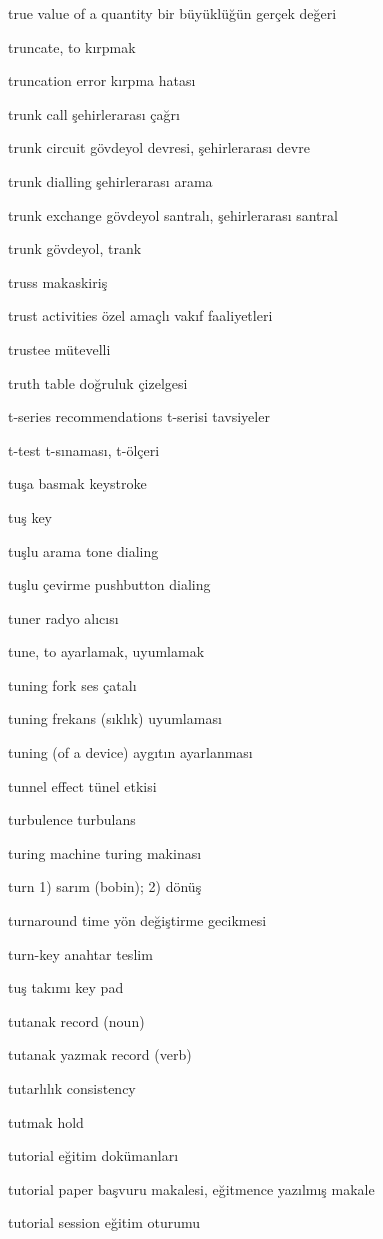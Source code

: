\documentclass[12pt,fleqn]{article}\usepackage{../../common}
\begin{document}
true value of a quantity bir büyüklüğün gerçek değeri

truncate, to kırpmak

truncation error kırpma hatası

trunk call şehirlerarası çağrı

trunk circuit gövdeyol devresi, şehirlerarası devre

trunk dialling şehirlerarası arama

trunk exchange gövdeyol santralı, şehirlerarası santral

trunk gövdeyol, trank

truss makaskiriş

trust activities özel amaçlı vakıf faaliyetleri

trustee mütevelli

truth table doğruluk çizelgesi

t-series recommendations t-serisi tavsiyeler

t-test t-sınaması, t-ölçeri

tuşa basmak keystroke

tuş key

tuşlu arama tone dialing

tuşlu çevirme pushbutton dialing

tuner radyo alıcısı

tune, to ayarlamak, uyumlamak

tuning fork ses çatalı

tuning frekans (sıklık) uyumlaması

tuning (of a device) aygıtın ayarlanması

tunnel effect tünel etkisi

turbulence turbulans

turing machine turing makinası

turn 1) sarım (bobin); 2) dönüş

turnaround time yön değiştirme gecikmesi

turn-key anahtar teslim

tuş takımı key pad

tutanak record (noun)

tutanak yazmak record (verb)

tutarlılık consistency

tutmak hold

tutorial eğitim dokümanları

tutorial paper başvuru makalesi, eğitmence yazılmış makale

tutorial session eğitim oturumu
\end{document}
